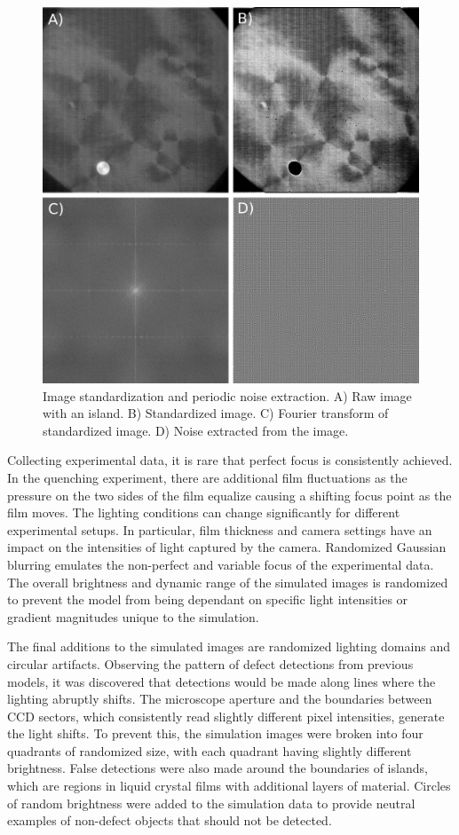 \documentclass[prl,reprint,showpacs,floatfix,nofootinbib]{revtex4-1}
\begin{document}
\begin{figure}
  \includegraphics[width=\linewidth*3/4]{noiseExtraction.png}
  \caption{Image standardization and periodic noise extraction. A) Raw image with an island. B) Standardized image. C) Fourier transform of standardized image. D) Noise extracted from the image.}
  \label{fig:Standardization and Noise}
\end{figure}

Collecting experimental data, it is rare that perfect focus is consistently achieved. In the quenching experiment, there are additional film fluctuations as the pressure on the two sides of the film equalize causing a shifting focus point as the film moves. The lighting conditions can change significantly for different experimental setups. In particular, film thickness and camera settings have an impact on the intensities of light captured by the camera. Randomized Gaussian blurring emulates the non-perfect and variable focus of the experimental data. The overall brightness and dynamic range of the simulated images is randomized to prevent the model from being dependant on specific light intensities or gradient magnitudes unique to the simulation.

The final additions to the simulated images are randomized lighting domains and circular artifacts. Observing the pattern of defect detections from previous models, it was discovered that detections would be made along lines where the lighting abruptly shifts. The microscope aperture and the boundaries between CCD sectors, which consistently read slightly different pixel intensities, generate the light shifts. To prevent this, the simulation images were broken into four quadrants of randomized size, with each quadrant having slightly different brightness. False detections were also made around the boundaries of islands, which are regions in liquid crystal films with additional layers of material. Circles of random brightness were added to the simulation data to provide neutral examples \cite{koppel_importance_2006} of non-defect objects that should not be detected.
\end{document}
